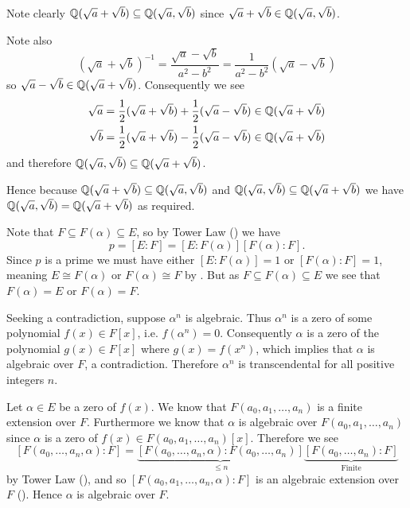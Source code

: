 \begin{questions}
    \item Note clearly $\mathbb{Q}(\sqrt a + \sqrt b) \subseteq \mathbb{Q}(\sqrt a, \sqrt b)$ since $\sqrt a + \sqrt b \in \mathbb{Q}(\sqrt a, \sqrt b)$.

    Note also
    \[
        (\sqrt a + \sqrt b)^{-1} = \frac{\sqrt a - \sqrt b}{a^2 - b^2} = \frac1{a^2-b^2}\left(\sqrt a - \sqrt b\right)
    \]
    so $\sqrt a - \sqrt b \in \mathbb{Q}(\sqrt a + \sqrt b)$. Consequently we see
    \begin{align*}
        \sqrt a &= \frac12(\sqrt a + \sqrt b) + \frac12(\sqrt a - \sqrt b) \in \mathbb{Q}(\sqrt a + \sqrt b)\\
        \sqrt b &= \frac12(\sqrt a + \sqrt b) - \frac12(\sqrt a - \sqrt b) \in \mathbb{Q}(\sqrt a + \sqrt b)
    \end{align*}
    and therefore $\mathbb{Q}(\sqrt a, \sqrt b) \subseteq \mathbb{Q}(\sqrt a + \sqrt b)$.

    Hence because $\mathbb{Q}(\sqrt a + \sqrt b) \subseteq \mathbb{Q}(\sqrt a, \sqrt b)$ and $\mathbb{Q}(\sqrt a, \sqrt b) \subseteq \mathbb{Q}(\sqrt a + \sqrt b)$ we have $\mathbb{Q}(\sqrt a, \sqrt b) = \mathbb{Q}(\sqrt a + \sqrt b)$ as required.

    \item Note that $F \subseteq F(\alpha) \subseteq E$, so by Tower Law () we have
    \[
        p = [E:F] = [E:F(\alpha)][F(\alpha):F].
    \]
    Since $p$ is a prime we must have either $[E:F(\alpha)] = 1$ or $[F(\alpha):F] = 1$, meaning $E \cong F(\alpha)$ or $F(\alpha) \cong F$ by . But as $F \subseteq F(\alpha) \subseteq E$ we see that $F(\alpha) = E$ or $F(\alpha) = F$.

    \item Seeking a contradiction, suppose $\alpha^n$ is algebraic. Thus $\alpha^n$ is a zero of some polynomial $f(x) \in F[x]$, i.e. $f(\alpha^n) = 0$. Consequently $\alpha$ is a zero of the polynomial $g(x) \in F[x]$ where $g(x) = f(x^n)$, which implies that $\alpha$ is algebraic over $F$, a contradiction. Therefore $\alpha^n$ is transcendental for all positive integers $n$.

    \item \begin{partquestions}{\roman*}
        \item Let $\alpha \in E$ be a zero of $f(x)$. We know that $F(a_0, a_1, \dots, a_n)$ is a finite extension over $F$. Furthermore we know that $\alpha$ is algebraic over $F(a_0, a_1, \dots, a_n)$ since $\alpha$ is a zero of $f(x) \in F(a_0, a_1, \dots, a_n)[x]$. Therefore we see
        \[
            [F(a_0, \dots, a_n, \alpha):F] = \underbrace{[F(a_0, \dots, a_n, \alpha):F(a_0, \dots, a_n)]}_{\leq n}\underbrace{[F(a_0, \dots, a_n):F]}_{\text{Finite}}
        \]
        by Tower Law (), and so $[F(a_0, a_1, \dots, a_n, \alpha):F]$ is an algebraic extension over $F$ (). Hence $\alpha$ is algebraic over $F$.


\end{partquestions}
\end{questions}
